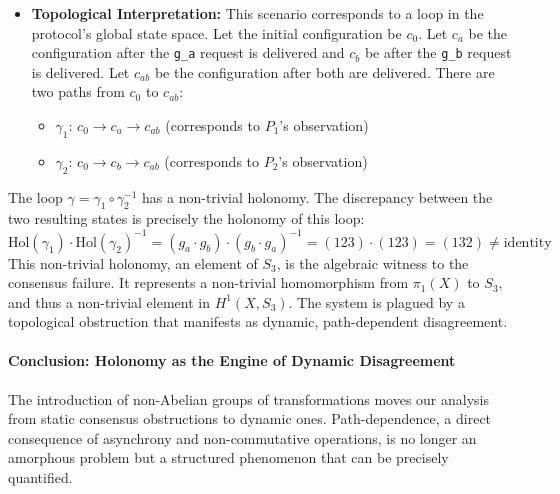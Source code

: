 \documentclass[
]{article}
\providecommand{\tightlist}{%
  \setlength{\itemsep}{0pt}\setlength{\parskip}{0pt}}
\begin{document}
\begin{itemize}
\tightlist
\item
  \textbf{Topological Interpretation:} This scenario corresponds to a
  loop in the protocol's global state space. Let the initial
  configuration be \(c_0\). Let \(c_a\) be the configuration after the
  \texttt{g\_a} request is delivered and \(c_b\) be after the
  \texttt{g\_b} request is delivered. Let \(c_{ab}\) be the
  configuration after both are delivered. There are two paths from
  \(c_0\) to \(c_{ab}\):

  \begin{itemize}
  \tightlist
  \item
    \(\gamma_1\): \(c_0 \to c_a \to c_{ab}\) (corresponds to \(P_1\)'s
    observation)
  \item
    \(\gamma_2\): \(c_0 \to c_b \to c_{ab}\) (corresponds to \(P_2\)'s
    observation)
  \end{itemize}
\end{itemize}

The loop \(\gamma = \gamma_1 \circ \gamma_2^{-1}\) has a non-trivial
holonomy. The discrepancy between the two resulting states is precisely
the holonomy of this loop:
\[ \text{Hol}(\gamma_1) \cdot \text{Hol}(\gamma_2)^{-1} = (g_a \cdot g_b) \cdot (g_b \cdot g_a)^{-1} = (1 2 3) \cdot (1 2 3) = (1 3 2) \neq \text{identity} \]
This non-trivial holonomy, an element of \(S_3\), is the algebraic
witness to the consensus failure. It represents a non-trivial
homomorphism from \(\pi_1(X)\) to \(S_3\), and thus a non-trivial
element in \(H^1(X, S_3)\). The system is plagued by a topological
obstruction that manifests as dynamic, path-dependent disagreement.

\paragraph{Conclusion: Holonomy as the Engine of Dynamic
Disagreement}\label{conclusion-holonomy-as-the-engine-of-dynamic-disagreement}

The introduction of non-Abelian groups of transformations moves our
analysis from static consensus obstructions to dynamic ones.
Path-dependence, a direct consequence of asynchrony and non-commutative
operations, is no longer an amorphous problem but a structured
phenomenon that can be precisely quantified.
\end{document}
